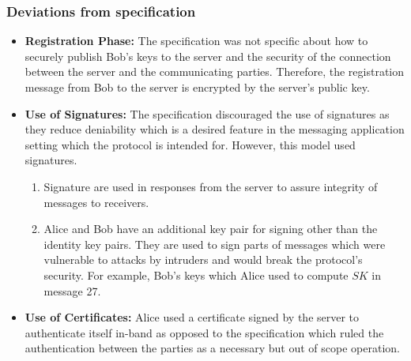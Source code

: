 \subsubsection{Deviations from specification}
\begin{itemize}
\item \textbf{Registration Phase:} The specification was not specific about how to securely publish Bob's keys to the server and the security of the connection between the server and the communicating parties. Therefore, the registration message from Bob to the server is encrypted by the server's public key.
\item \textbf{Use of Signatures:} The specification discouraged the use of signatures as they reduce deniability which is a desired feature in the messaging application setting which the protocol is intended for. However, this model used signatures.
\begin{enumerate}
	\item Signature are used in responses from the server to assure integrity of messages to receivers.
	\item Alice and Bob have an additional key pair for signing other than the identity key pairs. They are used to sign parts of messages which were vulnerable to attacks by intruders and would break the protocol's security. For example, Bob's keys which Alice used to compute $ SK $ in message 27.
\end{enumerate}
\item \textbf{Use of Certificates:} Alice used a certificate signed by the server to authenticate itself in-band as opposed to the specification which ruled the authentication between the parties as a necessary but out of scope operation.
\end{itemize}